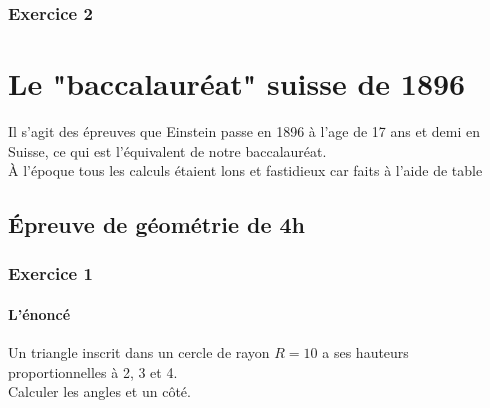 \documentclass[a4paper,11pt]{book}
\begin{document}
\subsection{Exercice 2}
\chapter{Le "baccalaur\'eat" suisse de 1896}
Il s'agit des \'epreuves que Einstein passe en 1896 \`a l'age de 17 ans et demi
en Suisse, ce qui est l'\'equivalent de notre  baccalaur\'eat.\\ 
\`A l'\'epoque tous les calculs \'etaient lons et fastidieux car faits \`a 
l'aide de table\section{\'Epreuve de g\'eom\'etrie de 4h}
\subsection{Exercice 1}
\subsubsection{L'\'enonc\'e}
Un triangle inscrit dans un cercle de rayon $R=10$ a ses hauteurs 
proportionnelles \`a 2, 3 et 4.\\
Calculer les angles et un c\^ot\'e.
\end{document}
